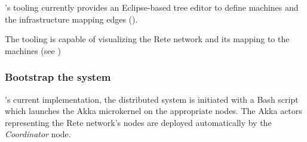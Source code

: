 \iqd{}'s tooling currently provides an Eclipse-based tree editor to define machines and the infrastructure mapping edges ().


The tooling is capable of visualizing the Rete network and its mapping to the machines (see )


\subsubsection{Bootstrap the system}

\iqd{}'s current implementation, the distributed system is initiated with a Bash script which launches the Akka microkernel on the appropriate nodes. The Akka actors representing the Rete network's nodes are deployed automatically by the \iqd{} \textit{Coordinator} node.
